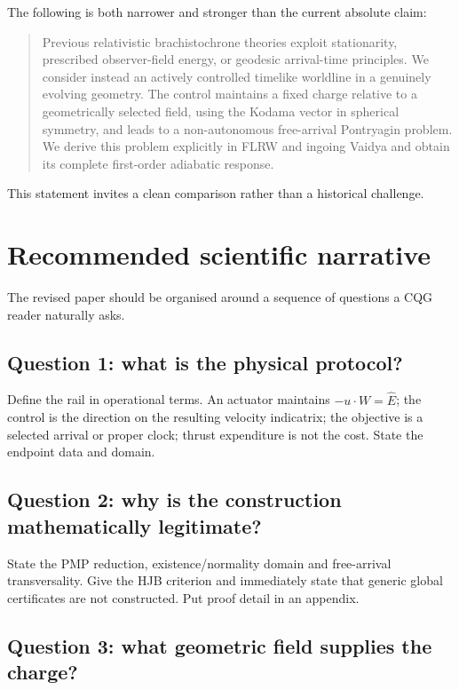 \documentclass[11pt,a4paper]{article}
\begin{document}
The following is both narrower and stronger than the current absolute claim:

\begin{quote}
Previous relativistic brachistochrone theories exploit stationarity, prescribed observer-field
energy, or geodesic arrival-time principles.  We consider instead an actively controlled timelike
worldline in a genuinely evolving geometry.  The control maintains a fixed charge relative to a
geometrically selected field, using the Kodama vector in spherical symmetry, and leads to a
non-autonomous free-arrival Pontryagin problem.  We derive this problem explicitly in FLRW and
ingoing Vaidya and obtain its complete first-order adiabatic response.
\end{quote}

This statement invites a clean comparison rather than a historical challenge.

\section{Recommended scientific narrative}

The revised paper should be organised around a sequence of questions a CQG reader naturally asks.

\subsection*{Question 1: what is the physical protocol?}

Define the rail in operational terms.  An actuator maintains $-u\cdot W=\hat E$; the control is
the direction on the resulting velocity indicatrix; the objective is a selected arrival or proper
clock; thrust expenditure is not the cost.  State the endpoint data and domain.

\subsection*{Question 2: why is the construction mathematically legitimate?}

State the PMP reduction, existence/normality domain and free-arrival transversality.  Give the HJB
criterion and immediately state that generic global certificates are not constructed.  Put proof
detail in an appendix.

\subsection*{Question 3: what geometric field supplies the charge?}
\end{document}
